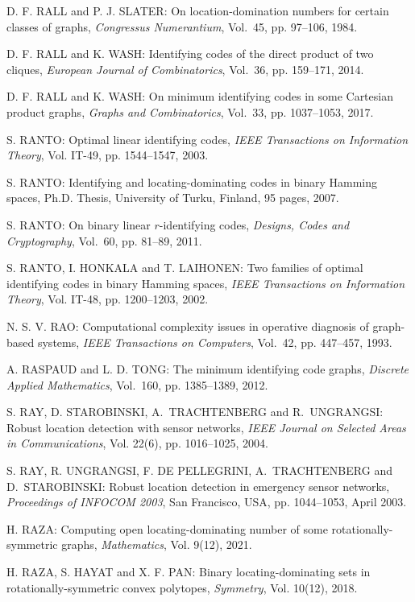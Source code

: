 \begin{thebibliography}{999}
D. F. RALL and P. J. SLATER: On location-domination numbers for certain classes of graphs, {\it Congressus Numerantium}, Vol.~45, pp. 97--106, 1984.

D. F. RALL and K. WASH: Identifying codes of the direct product of two cliques, {\it European Journal of Combinatorics}, Vol.~36, pp. 159--171, 2014.

D. F. RALL and K. WASH: On minimum identifying codes in some Cartesian product graphs, {\it Graphs and Combinatorics}, Vol.~33, pp. 1037--1053, 2017.

S. RANTO: Optimal linear identifying codes, {\it IEEE Transactions on Information Theory}, Vol. IT-49, pp. 1544--1547, 2003.

S. RANTO: Identifying and locating-dominating codes in binary Hamming spaces, Ph.D. Thesis, University of Turku, Finland, 95 pages, 2007.

S. RANTO: On binary linear $r$-identifying codes, {\it Designs, Codes and Cryptography}, Vol.~60, pp. 81--89, 2011.

S. RANTO, I. HONKALA and T. LAIHONEN: Two families of optimal identifying codes in binary Hamming spaces, {\it IEEE Transactions on Information Theory}, Vol. IT-48, pp. 1200--1203, 2002.

N. S. V. RAO: Computational complexity issues in operative diagnosis of graph-based systems, {\it IEEE Transactions on Computers}, Vol.~42, pp. 447--457, 1993.

A. RASPAUD and L. D. TONG: The minimum identifying code graphs, {\it Discrete Applied Mathematics}, Vol.~160, pp. 1385--1389, 2012.

S. RAY, D. STAROBINSKI, A.~TRACHTENBERG and R.~UNGRANGSI: Robust location detection with sensor networks, {\it IEEE Journal on Selected Areas in Communications}, Vol. 22(6), pp. 1016--1025, 2004.

S. RAY, R. UNGRANGSI, F. DE PELLEGRINI, A.~TRACHTENBERG and D.~STAROBINSKI: Robust location detection in emergency sensor networks, {\it Proceedings of INFOCOM 2003}, San Francisco, USA, pp. 1044--1053, April 2003.

H. RAZA: Computing open locating-dominating number of some rotationally-symmetric graphs, {\it Mathematics},  Vol. 9(12), 2021.

H. RAZA, S. HAYAT and X. F. PAN: Binary locating-dominating sets in rotationally-symmetric convex polytopes, {\it Symmetry},  Vol. 10(12), 2018.


\end{thebibliography}
